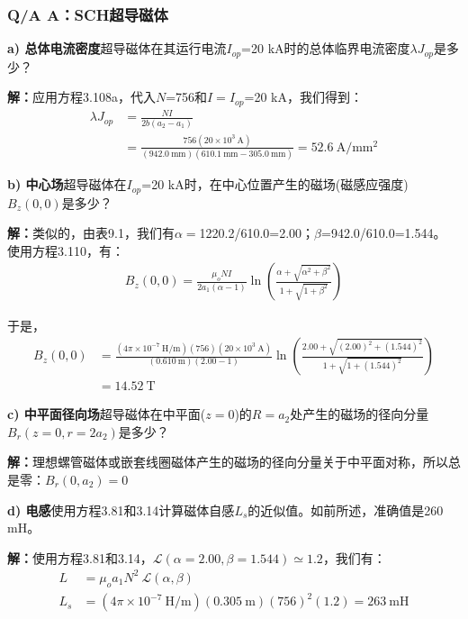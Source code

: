 \subsubsection{Q/A A：SCH超导磁体}
\textbf{a) 总体电流密度}\qquad 超导磁体在其运行电流$I_{op}$=20 kA时的总体临界电流密度$\lambda J_{op}$是多少？

\textbf{解：}应用方程3.108a，代入$N$=756和$I=I_{op}$=20 kA，我们得到：
\begin{align*}%
\lambda J_{op}&=\frac{NI}{2b(a_2-a_1)}\\ \tag{3.108a}
&=\frac{756(20\times10^3\ \mathrm{A})}{(942.0\ \mathrm{mm})(610.1\ \mathrm{mm}-305.0\ \mathrm{mm})}=52.6\ \mathrm{A/mm^2}
\end{align*}

\textbf{b) 中心场}\qquad 超导磁体在$I_{op}$=20 kA时，在中心位置产生的磁场(磁感应强度)$B_z(0,0)$是多少？

\textbf{解：}类似的，由表9.1，我们有$\alpha=$1220.2/610.0=2.00；$\beta$=942.0/610.0=1.544。
使用方程3.110，有：
\begin{align*}%
B_{z}(0,0)=\frac{\mu_oNI}{2a_1(\alpha-1)}\ln(\frac{\alpha+\sqrt{\alpha^2+\beta^2}}{1+\sqrt{1+\beta^2}}) \tag{3.110}
\end{align*}

于是，
\begin{align*}%
B_z(0,0)&=\frac{(4\pi\times10^{-7}\ \mathrm{H/m})(756)(20\times10^3\ \mathrm{A})}{(0.610\ \mathrm{m})(2.00-1)}\ln(\frac{2.00+\sqrt{(2.00)^2+(1.544)^2}}{1+\sqrt{1+(1.544)^2}})\\
&=14.52\ \mathrm{T}
\end{align*}

\textbf{c) 中平面径向场}\qquad 超导磁体在中平面($z=0$)的$R=a_2$处产生的磁场的径向分量$B_r(z=0,r=2a_2)$是多少？

\textbf{解：}理想螺管磁体或嵌套线圈磁体产生的磁场的径向分量关于中平面对称，所以总是零：$B_r(0,a_2)=0$

\textbf{d) 电感}\qquad 使用方程3.81和3.14计算磁体自感$L_s$的近似值。如前所述，准确值是260 mH。

\textbf{解：}使用方程3.81和3.14，$\mathcal{L}(\alpha=2.00,\beta=1.544)\simeq 1.2$，我们有：
\begin{align*}%
L&=\mu_oa_1N^2\ \mathcal{L}(\alpha,\beta) \\\tag{3.81}
L_s&=(4\pi\times10^{-7}\ \mathrm{H/m})(0.305\ \mathrm{m})(756)^2(1.2)=263\ \mathrm{mH}
\end{align*}

